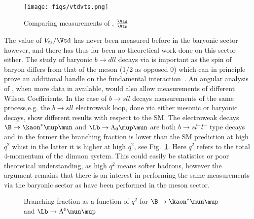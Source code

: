 \begin{figure}
\texttt{[image: figs/vtdvts.png]}
\caption{Comparing measurements of \Vtd, \Vts $\frac{\Vtd}{\Vts}$}
\end{figure}



The value of $V_{ts}/\Vtd$ has never been measured before in the baryonic sector however, and there has thus far been no theoretical work done on this sector either. The study of baryonic $b\to dll$ decays via \Lbpi is important as the spin of \Lb baryon differs from that of the \B meson (1/2 as opposed 0) which can in principle prove an additional handle on the fundamental interaction~\cite{Meinel}. An angular analysis of \Lbpi, when more data in available, would also allow measurements of different Wilson Coefficients. In the case of $b\to sll$ decays measurements of the same process,e.g. the $b\to sll$ electroweak loop, done via either mesonic or baryonic decays, show different results with respect to the SM. The electroweak decays $\B\to\kaon^{*}\mup\mun$ and $\Lb\to\Lambda_{0}\mup\mun$ are both $b\to sl^{+}l^{-}$ type decays and in the former the branching fraction is lower than the SM prediction at high $q^{2}$ whist in the latter it is higher at high $q^{2}$, see Fig.~\ref{fig:bfq2}. Here $q^{2}$ refers to the total 4-momentum of the dimuon system. This could easily be statistics or poor theoretical understanding, as high $q^{2}$ means softer hadrons, however the argument remains that there is an interest in performing the same measurements via the baryonic sector as have been performed in the meson sector.
\begin{figure}[!h]\def\nh{0.5\textwidth}
  \centering
  \hspace*{-2cm}  
  \caption{Branching fraction as a function of $q^{2}$ for \protect{} $\B\to\kaon^{*}\mun\mup$~\cite{LHCB-PAPER-2015-051} and \protect{} $\Lb\to\Lambda^{0}\mun\mup$~\cite{LHCB-PAPER-2015-009}}
  \label{fig:bfq2}
\end{figure}

